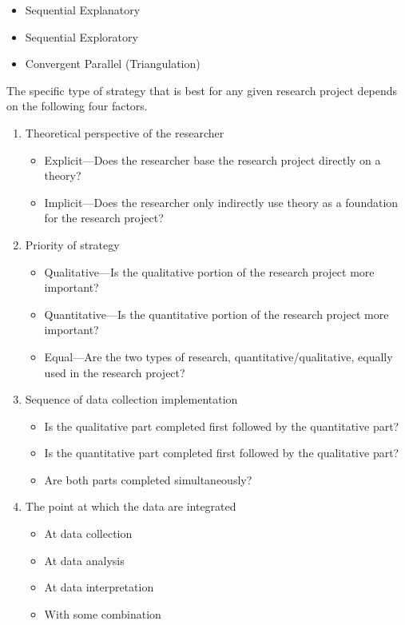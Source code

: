\begin{itemize}

	\item Sequential Explanatory

	\item Sequential Exploratory

	\item Convergent Parallel (Triangulation)

\end{itemize}

The specific type of strategy that is best for any given research project depends on the following four factors.

\begin{enumerate}
	\item Theoretical perspective of the researcher
	\begin{itemize}
		\item Explicit–--Does the researcher base the research project directly on a theory?
		\item Implicit–--Does the researcher only indirectly use theory as a foundation for the research project?
	\end{itemize}

	\item Priority of strategy
	\begin{itemize}
		\item Qualitative---Is the qualitative portion of the research project more important?
		\item Quantitative---Is the quantitative portion of the research project more important?
		\item Equal---Are the two types of research, quantitative/qualitative, equally used in the research project?
	\end{itemize}

	\item Sequence of data collection implementation
	\begin{itemize}
		\item Is the qualitative part completed first followed by the quantitative part?
		\item Is the quantitative part completed first followed by the qualitative part?
		\item Are both parts completed simultaneously?
	\end{itemize}

	\item The point at which the data are integrated
	\begin{itemize}
		\item At data collection
		\item At data analysis
		\item At data interpretation
		\item With some combination
	\end{itemize}

\end{enumerate}

